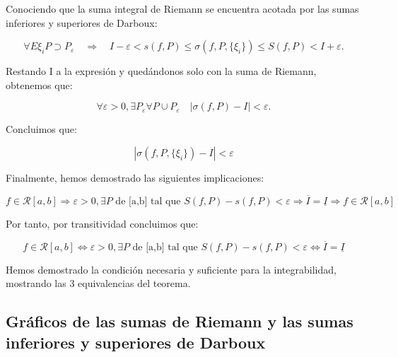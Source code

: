 \documentclass[a4paper,12pt]{article}
\begin{document}
	
	
	Conociendo que la suma integral de Riemann se encuentra acotada por las sumas inferiores y superiores de Darboux:
	
	
	
	\[
	\forall {E\xi_i} P \supset P_\varepsilon \quad \Rightarrow \quad I - \varepsilon < s(f, P) \leq \sigma(f, P, \{\xi_i\}) \leq S(f,P) < I + \varepsilon.
	\]
	
	
	
	Restando I a la expresión y quedándonos solo con la suma de Riemann, obtenemos que:
	
	
	
	\[
	\forall \varepsilon > 0, \exists P_\varepsilon \forall P \cup P_\varepsilon \quad \big| \sigma(f,P) - I \big| < \varepsilon.
	\]
	
	Concluimos que:
	
	\[
	\left| \sigma(f, P, \{\xi_i\}) - I \right| < \varepsilon
	\]
	
	Finalmente, hemos demostrado las siguientes implicaciones:
	
	\[
	f \in \mathcal{R}[a,b] \Rightarrow \varepsilon > 0, \exists P \text{ de [a,b] tal que }   S(f,P) - s(f,P) < \varepsilon \Rightarrow \overline{I} = \underline{I} \Rightarrow f \in \mathcal{R}[a,b] 
	\]
	
	Por tanto, por transitividad concluimos que:
	
	\[
	f \in \mathcal{R}[a,b] \Longleftrightarrow \varepsilon > 0, \exists P \text{ de [a,b] tal que }   S(f,P) - s(f,P) < \varepsilon \Longleftrightarrow \overline{I} = \underline{I} 
	\]
	
	Hemos demostrado la condición necesaria y suficiente para la integrabilidad, mostrando las 3 equivalencias del teorema.
	
	\subsection{Gráficos de las sumas de Riemann y las sumas inferiores y superiores de Darboux}
	
\end{document}
